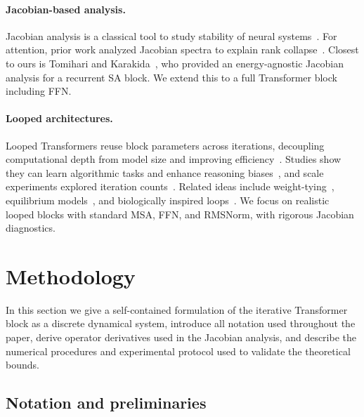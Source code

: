 \documentclass{zapiski}
\theoremstyle{plain}
\theoremstyle{definition}
\theoremstyle{remark}
\begin{document}
\paragraph{Jacobian-based analysis.}
Jacobian analysis is a classical tool to study stability of neural systems~\cite{boedecker2012information,poole2016exponential,pennington2017resurrecting,haber2017stable,chang2019antisymmetricrnn,yoshida2017spectral,lewandowski2024learning}. For attention, prior work analyzed Jacobian spectra to explain rank collapse~\cite{noci2022signalpropagationtransformerstheoretical,castin2023smooth}. Closest to ours is Tomihari and Karakida~\cite{tomihari2025recurrentselfattentiondynamicsenergyagnostic}, who provided an energy-agnostic Jacobian analysis for a recurrent SA block. We extend this to a full Transformer block including FFN.

\paragraph{Looped architectures.}
Looped Transformers reuse block parameters across iterations, decoupling computational depth from model size and improving efficiency~\cite{dehghani2018universal}. Studies show they can learn algorithmic tasks and enhance reasoning biases~\cite{yang2023looped,giannou2023looped,saunshi2025reasoning}, and scale experiments explored iteration counts~\cite{geiping2025scaling,bansal2022end}. Related ideas include weight-tying~\cite{lan2019albert}, equilibrium models~\cite{bai2019deep}, and biologically inspired loops~\cite{miyato2024artificial}. We focus on realistic looped blocks with standard MSA, FFN, and RMSNorm, with rigorous Jacobian diagnostics.

\section{Methodology}
\label{sec:method}

In this section we give a self-contained formulation of the iterative Transformer block
as a discrete dynamical system, introduce all notation used throughout the paper, derive operator
derivatives used in the Jacobian analysis, and describe the numerical procedures and experimental
protocol used to validate the theoretical bounds.

\subsection{Notation and preliminaries}
\label{ssec:notation}
\end{document}
